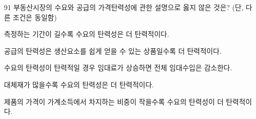 \begin{question}{91}
부동산시장의 수요와 공급의 가격탄력성에 관한 설명으로 옳지 않은 것은? (단, 다른 조건은 동일함)
\begin{choices}
  \item 측정하는 기간이 길수록 수요의 탄력성은 더 탄력적이다.
  \item 공급의 탄력성은 생산요소를 쉽게 얻을 수 있는 상품일수록 더 탄력적이다.
  \item 수요의 탄력성이 탄력적일 경우 임대료가 상승하면 전체 임대수입은 감소한다.
  \item 대체재가 많을수록 수요의 탄력성은 더 탄력적이다.
  \item 제품의 가격이 가계소득에서 차지하는 비중이 작을수록 수요의 탄력성이 더 탄력적이다.
\end{choices}
\end{question}
